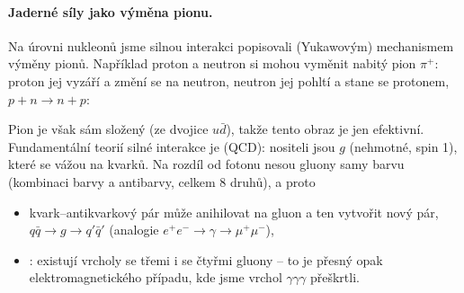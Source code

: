 \paragraph{Jaderné síly jako výměna pionu.}
Na úrovni nukleonů jsme silnou interakci popisovali (Yukawovým) mechanismem výměny pionů. Například proton a neutron si mohou vyměnit nabitý pion $\pi^+$: proton jej vyzáří a změní se na neutron, neutron jej pohltí a stane se protonem, $p+n\to n+p$:
\begin{center}
\end{center}
Pion je však sám složený (ze dvojice $u\bar d$), takže tento obraz je jen efektivní. Fundamentální teorií silné interakce je  (QCD): nositeli jsou  $g$ (nehmotné, spin 1), které se vážou na  kvarků. Na rozdíl od fotonu nesou gluony samy barvu (kombinaci barvy a antibarvy, celkem 8 druhů), a proto
\begin{itemize}
  \item kvark--antikvarkový pár může anihilovat na gluon a ten vytvořit nový pár, $q\bar q\to g\to q'\bar q'$ (analogie $e^+e^-\to\gamma\to\mu^+\mu^-$),
  \item {}: existují vrcholy se třemi i se čtyřmi gluony -- to je přesný opak elektromagnetického případu, kde jsme vrchol $\gamma\gamma\gamma$ přeškrtli.
\end{itemize}
